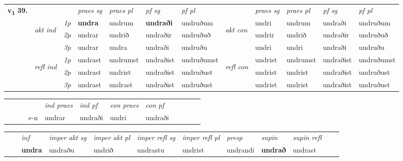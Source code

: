 \begin{tabular}{llllllllllll} \toprule
\multirow{4}{*}{{{\textbf{v{\textsubscript{1}}} \Large{\textbf{39.}}}}}  & &   &  \textit{praes sg}  & \textit{praes pl}  &\textit{ pf sg} & \textit{pf pl} &  &  \textit{praes sg}  & \textit{praes pl}  & \textit{pf sg} & \textit{pf pl } \\*
	\cmidrule{4-7} \cmidrule{9-12}
 & \multirow{3}{*}{\begin{turn}{90}\textit{akt ind}\end{turn}} & {\textit{1p}} & \textbf{undra} & undrum    & \textbf{undraði} & undruðum & \multirow{3}{*}{\begin{turn}{90}\textit{akt con}\end{turn}} &undri & undrum & undraði & undruðum\\*
& &  {\textit{2p}} &  undrar  & undrið   & undraðir & undruðuð & & undrir & undrið & undraðir & undruðuð \\*
& &  {\textit{3p}} & undrar & undra   & undraði & undruðu & & undri & undri& undraði & undruðu  \\*
\cmidrule{4-7} \cmidrule{9-12}
 &\multirow{3}{*}{\begin{turn}{90}\textit{refl ind}\end{turn}} & {\textit{1p}} & undrast & undrumst    & undraðist & undruðumst & \multirow{3}{*}{\begin{turn}{90}\textit{refl con}\end{turn}}  &undrist & undrumst & undraðist & undruðumst\\*
 &&  {\textit{2p}} &  undrast  & undrist   & undraðist & undruðust & &undrist & undrist & undraðist & undruðust \\*
& &  {\textit{3p}} & undrast & undrast   & undraðist & undruðust & & undrist & undrist& undraðist & undruðust  \\*
\cmidrule{4-7} \cmidrule{9-12}
\end{tabular}


\begin{tabular}{llllllllllll}
 & &  & &  \textit{ind praes} & \textit{ind pf} & \textit{con praes} & \textit{con pf} \\*
&  & & e-n & undrar & undraði & undri & undraði \\*
\cmidrule{5-9}
\end{tabular}


\begin{tabular}{llllllllllll}
 & & \textit{inf} & \textit{imper akt sg} & \textit{imper akt pl} & \textit{imper refl sg} & \textit{imper refl pl} & \textit{presp} & \textit{supin} & \textit{supin refl}      \\*
  & & \textbf{undra} & undraðu  & undrið & undrastu & undrist & undrandi &  \textbf{undrað} & undrast  \\*
\cmidrule{1-12}
\end{tabular}



